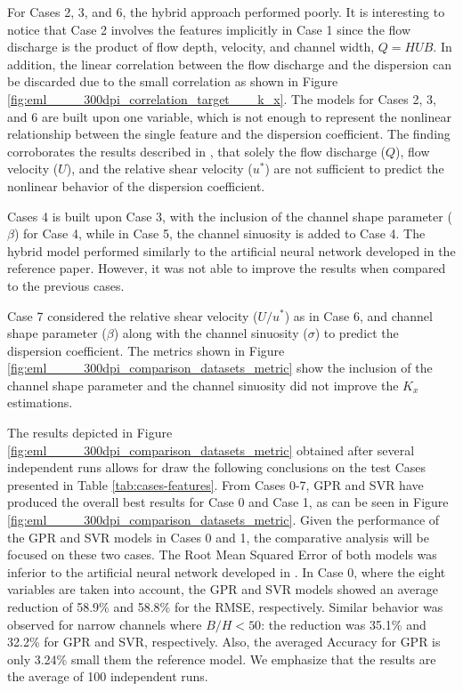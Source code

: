 \documentclass[a4paper,12pt, english]{article}
\begin{document}
For Cases 2, 3, and 6, the hybrid approach performed poorly. 
It is interesting to notice that Case 2 involves the features implicitly in Case 1 since the flow discharge is the product of flow
depth, velocity, and channel width, $Q = HUB$.  
In addition, the linear correlation between the flow discharge and the dispersion can be discarded due to the small correlation as shown in Figure  \ref{fig:eml____300dpi_correlation_target___k_x}. 
The models for Cases 2, 3, and 6 are built upon one variable, which is not enough to represent the nonlinear relationship between the single feature and the dispersion coefficient. The finding corroborates the results described in \cite{tayfur2005predicting}, that solely the flow discharge ($Q$), flow velocity ($U$), and the relative shear velocity ($u^*$) are not sufficient to predict the nonlinear behavior of the dispersion coefficient.

Cases 4 is built upon Case 3, with the inclusion of the channel shape parameter ($\beta$) for Case 4, while in Case 5, the channel sinuosity is added to Case 4.
The hybrid model performed similarly to the artificial neural network developed in the reference paper. However, it was not able to improve the results when compared to the previous cases.  

Case 7 considered the relative shear velocity ($U/u^*$) as in Case 6,  and channel shape parameter ($\beta$)  along with the channel sinuosity ($\sigma$) to predict the dispersion coefficient. The metrics shown in Figure \ref{fig:eml____300dpi_comparison_datasets_metric} show the inclusion of the channel shape parameter and the channel sinuosity did not improve the $K_x$ estimations.


The results depicted in Figure \ref{fig:eml____300dpi_comparison_datasets_metric} obtained after several independent runs allows for draw the following conclusions on the test Cases presented in Table \ref{tab:cases-features}. 
% 
From Cases 0-7, GPR and SVR  have produced the overall best results for Case 0 and Case 1, as can be seen in Figure \ref{fig:eml____300dpi_comparison_datasets_metric}. 
Given the performance of the GPR and SVR models in Cases 0 and 1, the comparative analysis will be focused on these two cases.
The Root Mean Squared Error of both models was inferior to the artificial neural network developed in \cite{tayfur2005predicting}. 
In Case 0,  where the eight variables are taken into account, the GPR and SVR models showed an average reduction of 58.9\% and 58.8\% for the RMSE, respectively. Similar behavior was observed for narrow channels where $ B / H <50 $: the reduction was 35.1\% and 32.2\% for GPR and SVR, respectively. Also,  the averaged Accuracy for GPR  is only 3.24\% small them the reference model. We emphasize that the results are the average of 100 independent runs.
\end{document}
